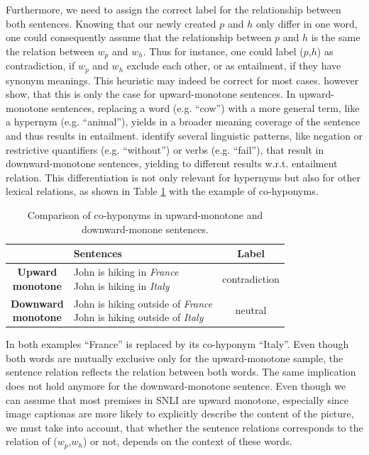 \noindent
Furthermore, we need to assign the correct label for the relationship between both sentences. Knowing that our newly created $p$ and $h$ only differ in one word, one could consequently assume that the relationship between $p$ and $h$ is the same the relation between $w_p$ and $w_h$. Thus for instance, one could label ($p$,$h$) as contradiction, if $w_p$ and $w_h$ exclude each other, or as entailment, if they have synonym meanings. This heuristic may indeed be correct for most cases. \cite{maccartney2007natural} however show, that this is only the case for upward-monotone sentences. In upward-monotone sentences, replacing a word (e.g. ``cow'') with a more general term, like a hypernym (e.g. ``animal''), yields in a broader meaning coverage of the sentence and thus results in entailment. \cite{maccartney2007natural} identify several linguistic patterns, like negation or restrictive quantifiers (e.g. ``without'') or verbs (e.g. ``fail''), that result in downward-monotone sentences, yielding to different results w.r.t. entailment relation. This differentiation is not only relevant for hypernyms but also for other lexical relations, as shown in Table \ref{tab:monoton_samples} with the example of co-hyponyms.
\begin{table}[htt]
\centering
\begin{tabular}{c|lc}
& \textbf{Sentences} & \textbf{Label} \\
\toprule
\specialcellc{\textbf{Upward}\\\textbf{monotone}} & \specialcell{John is hiking in \textit{France}\\John is hiking in \textit{Italy}} & contradiction \\
\midrule
\specialcellc{\textbf{Downward}\\\textbf{monotone}} & \specialcell{John is hiking outside of \textit{France}\\John is hiking outside of \textit{Italy}} & neutral \\
\bottomrule
\end{tabular}
 \caption{Comparison of co-hyponyms in upward-monotone and downward-monone sentences.}
 \label{tab:monoton_samples}

\end{table}
In both examples ``France'' is replaced by its co-hyponym ``Italy''. Even though both words are mutually exclusive only for the upward-monotone sample, the sentence relation reflects the relation between both words. The same implication does not hold anymore for the downward-monotone sentence. Even though we can assume that most premises in \ac{SNLI} are upward monotone, especially since image captionas are more likely to explicitly describe the content of the picture, we must take into account, that whether the sentence relations corresponds to the relation of ($w_p$,$w_h$) or not, depends on the context of these words.


